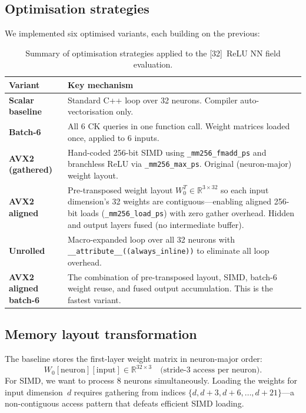 \documentclass[11pt,a4paper]{article}
\begin{document}
\subsection{Optimisation strategies}

We implemented six optimised variants, each building on the previous:

\begin{table}[htbp]
\centering
\caption{Summary of optimisation strategies applied to the [32]~ReLU
NN field evaluation.}
\label{tab:opt_strategies}
\begin{tabular}{lp{9cm}}
\toprule
Variant & Key mechanism \\
\midrule
\textbf{Scalar baseline} & Standard C++ loop over 32 neurons.
    Compiler auto-vectorisation only. \\
\textbf{Batch-6} & All 6 CK queries in one function call.
    Weight matrices loaded once, applied to 6 inputs. \\
\textbf{AVX2 (gathered)} & Hand-coded 256-bit SIMD using
    \texttt{\_mm256\_fmadd\_ps} and branchless ReLU via
    \texttt{\_mm256\_max\_ps}.  Original (neuron-major) weight
    layout. \\
\textbf{AVX2 aligned} & Pre-transposed weight layout
    $W_0^T \in \mathbb{R}^{3 \times 32}$ so each input dimension's
    32 weights are contiguous---enabling aligned 256-bit loads
    (\texttt{\_mm256\_load\_ps}) with zero gather overhead.
    Hidden and output layers fused (no intermediate buffer). \\
\textbf{Unrolled} & Macro-expanded loop over all 32 neurons with
    \texttt{\_\_attribute\_\_((always\_inline))} to eliminate all loop
    overhead. \\
\textbf{AVX2 aligned batch-6} & The combination of pre-transposed
    layout, SIMD, batch-6 weight reuse, and fused output
    accumulation.  This is the fastest variant. \\
\bottomrule
\end{tabular}
\end{table}


\subsection{Memory layout transformation}
\label{sec:layout}

The baseline stores the first-layer weight matrix in neuron-major
order:
\begin{equation}
    W_0[\text{neuron}][\text{input}] \in \mathbb{R}^{32 \times 3}
    \quad\text{(stride-3 access per neuron)}.
\end{equation}
For SIMD, we want to process 8 neurons simultaneously.  Loading the
weights for input dimension~$d$ requires gathering from indices
$\{d, d{+}3, d{+}6, \ldots, d{+}21\}$---a non-contiguous access
pattern that defeats efficient SIMD loading.
\end{document}
